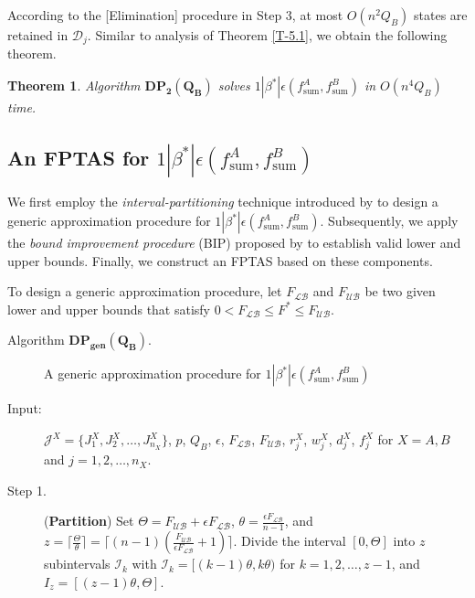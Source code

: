 \documentclass[12pt]{article}
\newtheorem{theorem}{Theorem}[section]
\begin{document}
\begin{sloppypar}
According to the [Elimination] procedure in Step 3, at most $O(n^2 Q_B)$ states are retained in $\mathcal{D}_j$. Similar to analysis of Theorem \ref{T-5.1}, we obtain the following theorem.

\begin{theorem} \label{T-6.1}
Algorithm $\mathbf{DP_2(Q_B)}$ solves $1 | \beta^{*}|\epsilon(f_{\mathrm{sum}}^A, f_{\mathrm{sum}}^B)$ in $O(n^4 Q_B)$ time.
\end{theorem}

\subsection{An FPTAS for $1 | \beta^{*}|\epsilon(f_{\mathrm{sum}}^A, f_{\mathrm{sum}}^B)$}

We first employ the \emph{interval-partitioning} technique introduced by \cite{Sahni1976JACM} to design a generic approximation procedure for $1 | \beta^{*}|\epsilon(f_{\mathrm{sum}}^A, f_{\mathrm{sum}}^B)$. Subsequently, we apply the \emph{bound improvement procedure} (BIP) proposed by \cite{ChubanovKP2006MP} to establish valid lower and upper bounds. Finally, we construct an FPTAS based on these components.

To design a generic approximation procedure, let $F_{\mathcal{LB}}$ and $F_{\mathcal{UB}}$ be two given lower and upper bounds that satisfy $0< F_{\mathcal{LB}} \leq F^{*} \leq F_{\mathcal{UB}}$.

\begin{description}
\item [Algorithm $\mathbf{DP_{gen}(Q_B)}$.] A generic approximation procedure for $1 | \beta^{*}|\epsilon(f_{\mathrm{sum}}^A, f_{\mathrm{sum}}^B)$

\item [Input:] ${\mathcal J}^{X}=\{J_1^{X}, J_2^{X}, \ldots, J_{n_X}^{X}\}$, $p$, $Q_B$, $\epsilon$, $F_{\mathcal{LB}}$, $F_{\mathcal{UB}}$, $r_j^X$, $w_j^X$, $d_j^X$, $f_j^X$ for $X = A,B$ and $j=1, 2, \ldots, n_X$.

\item [Step 1.] (\textbf{Partition}) Set $\Theta=F_{\mathcal{UB}}+\epsilon F_{\mathcal{LB}}$, $\theta=\frac{\epsilon F_{\mathcal{LB}}}{n-1}$, and
$z= \lceil \frac{\Theta}{\theta} \rceil =\lceil (n-1)(\frac{ F_{\mathcal{UB}}}{\epsilon F_{\mathcal{LB}}}+1) \rceil$. Divide the interval $[0, \Theta]$ into $z$ subintervals $\mathcal{I}_k$ with $\mathcal{I}_k=[(k-1) \theta, k \theta)$ for $k=1, 2, \ldots, z-1$,
and $I_{z}=[(z-1) \theta, \Theta]$.


\end{description}
\end{sloppypar}
\end{document}
